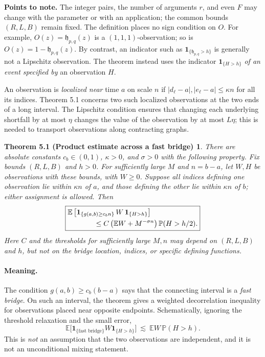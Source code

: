 \documentclass[11pt,a4paper]{article}
\newtheorem*{bridge}{Theorem 5.1 (Product estimate across a fast bridge)}
\newcommand{\PP}{\mathbb{P}}
\newcommand{\EE}{\mathbb{E}}
\newcommand{\one}{\mathbf{1}}
\begin{document}
\textbf{Points to note.}
The integer pairs, the number of arguments $r$, and even $F$ may change
with the parameter or with an application; the common bounds $(R,L,B)$
remain fixed. The definition places no sign condition on $O$. For example,
$O(z)=\mathfrak h_{p,q}(z)$ is a $(1,1,1)$-observation; so is
$O(z)=1-\mathfrak h_{p,q}(z)$. By contrast, an indicator such as
$\one_{\{\mathfrak h_{p,q}>h\}}$ is generally not a Lipschitz observation.
The theorem instead uses the indicator $\one_{\{H>h\}}$ \emph{of an event
specified by} an observation $H$.

An observation is \emph{localized near} time $a$ on scale $n$ if
$|d_\ell-a|,|e_\ell-a|\le\kappa n$ for all its indices. Theorem 5.1
concerns two such localized observations at the two ends of a long interval.
The Lipschitz condition ensures that changing each underlying shortfall by
at most $\eta$ changes the value of the observation by at most $L\eta$;
this is needed to transport observations along contracting graphs.

\begin{bridge}
There are absolute constants $c_b\in(0,1)$, $\kappa>0$, and $\sigma>0$ with the following property. Fix bounds $(R,L,B)$ and $h>0$. For sufficiently large $M$ and $n=b-a$, let $W,H$ be observations with these bounds, with $W\ge0$. Suppose all indices defining one observation lie within $\kappa n$ of $a$, and those defining the other lie within $\kappa n$ of $b$; either assignment is allowed. Then
\begin{equation}\label{eq:bridge}
\boxed{\begin{aligned}
&\EE\left[\one_{\{g(a,b)\ge c_b n\}}\,W\,\one_{\{H>h\}}\right]\\
&\hspace{13mm}\le C\left(\EE W+M^{-\sigma n}\right)\PP(H>h/2).
\end{aligned}}
\end{equation}
Here $C$ and the thresholds for sufficiently large $M,n$ may depend on $(R,L,B)$ and $h$, but not on the bridge location, indices, or specific defining functions.
\end{bridge}

\paragraph{Meaning.} The condition $g(a,b)\ge c_b(b-a)$ says that the connecting interval is a \emph{fast bridge}. On such an interval, the theorem gives a weighted decorrelation inequality for observations placed near opposite endpoints. Schematically, ignoring the threshold relaxation and the small error,
\[
 \EE\bigl[\one_{\{\text{fast bridge}\}}W\one_{\{H>h\}}\bigr]
 \ \lesssim\ \EE W\,\PP(H>h).
\]
This is \emph{not} an assumption that the two observations are independent, and it is not an unconditional mixing statement.
\end{document}
